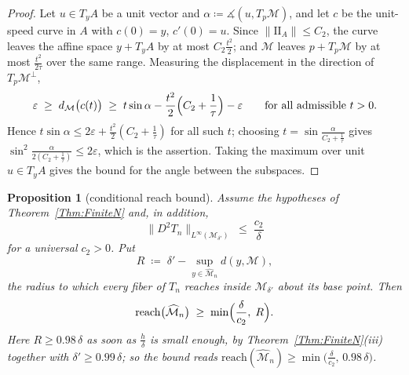 \documentclass[11pt]{amsart}%
\theoremstyle{plain}
\newtheorem{proposition}[definition]{Proposition}
\newcommand{\1}{\mathbf{1}}
\newcommand{\M}{\mathcal{M}}
\newcommand{\II}{\mathrm{I\!I}}   %
\begin{document}
\begin{proof}
    Let $u\in T_yA$ be a unit vector and $\alpha\coloneqq\measuredangle(u,T_p\M)$, and let $c$ be the
    unit-speed curve in $A$ with $c(0)=y$, $c'(0)=u$. Since $\|\II_A\|\le C_2$, the curve
    leaves the affine space $y+T_yA$ by at most $C_2\frac{t^2}{2}$; and $\M$ leaves $p+T_p\M$ by at most
    $\frac{t^2}{2\tau}$ over the same range. Measuring the displacement in the direction of $T_p\M^{\perp}$,
    \[
        \varepsilon\;\ge\;d_\M\bigl(c(t)\bigr)\;\ge\;t\sin\alpha-\frac{t^2}{2}\Bigl(C_2+\frac1\tau\Bigr)-\varepsilon
        \qquad\text{for all admissible } t>0 .
    \]
    Hence $t\sin\alpha\le2\varepsilon+\tfrac{t^2}{2}(C_2+\frac{1}{\tau})$ for all such $t$; choosing
    $t=\sin\frac{\alpha}{C_2+\frac{1}{\tau}}$ gives
    $\sin^2\frac{\alpha}{2\left(C_2+\frac{1}{\tau}\right)}\le2\varepsilon$, which is the assertion. Taking the
    maximum over unit $u\in T_yA$ gives the bound for the angle between the subspaces.
\end{proof}

\begin{proposition}[conditional reach bound]
    \label{Prop:ReachC2}
    Assume the hypotheses of Theorem~\ref{Thm:FiniteN} and, in addition,
    \[
        \|D^2T_n\|_{L^\infty(\M_{\delta'})}\;\le\;\frac{c_2}{\delta}
    \]
    for a universal $c_2>0$. Put
    \[
        R\;\coloneqq\;\delta'-\sup_{y\in\widehat{\M}_n} d(y,\M) ,
    \]
    the radius to which every fiber of $T_n$ reaches inside $\M_{\delta'}$ about its base point.
    Then
    \[
        \mathrm{reach}\bigl(\widehat{\M}_n\bigr)\;\ge\;\min\Bigl(\frac{\delta}{c_2},\;R\Bigr).
    \]
    Here $R\ge0.98\,\delta$ as soon as $\frac{h}{\delta}$ is small enough, by
    Theorem~\ref{Thm:FiniteN}(iii) together with $\delta'\ge0.99\,\delta$; so the bound reads
    $\mathrm{reach}(\widehat{\M}_n)\ge\min\bigl(\frac{\delta}{c_2},\,0.98\,\delta\bigr)$.
\end{proposition}
\end{document}
